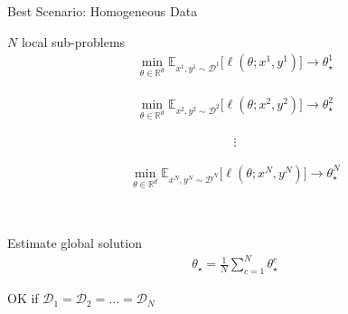 \documentclass[aspectratio=169,14pt]{beamer}
\begin{document}
\begin{frame}{Best Scenario: Homogeneous Data}

  \begin{minipage}[t]{0.5\linewidth}
    $N$ local sub-problems
    \small
    \begin{align*}
      \min_{\theta \in \mathbb{R}^d}
      \mathbb{E}_{x^1, y^1 \sim \mathcal{D}^1} \Big[ \ell( \theta; x^1, y^1 ) \Big]
      \rightarrow
      \theta_\star^1
    \end{align*}

    \vspace{-2em}
    
    \begin{align*}
      \min_{\theta \in \mathbb{R}^d}
      \mathbb{E}_{x^2, y^2 \sim \mathcal{D}^2} \Big[ \ell( \theta; x^2, y^2 ) \Big]
      \rightarrow
      \theta_\star^2
    \end{align*}

    \vspace{-2em}

    \begin{align*}
      \vdots
    \end{align*}

    \vspace{-2em}
    
    \begin{align*}
      \min_{\theta \in \mathbb{R}^d} 
      \mathbb{E}_{x^N, y^N \sim \mathcal{D}^N} \Big[ \ell( \theta; x^N, y^N ) \Big]
      \rightarrow
      \theta_\star^N
    \end{align*}
  \end{minipage}~~~~%
  \begin{minipage}[t]{0.45\linewidth}
    \pause
    
    Estimate global solution
    \begin{align*}
      \theta_\star
      = \frac{1}{N} \sum_{c=1}^N \theta_\star^c
    \end{align*}

    OK if $\mathcal{D}_1 = \mathcal{D}_2 = \dots = \mathcal{D}_N$ 
  \end{minipage}
  
\end{frame}
\end{document}
